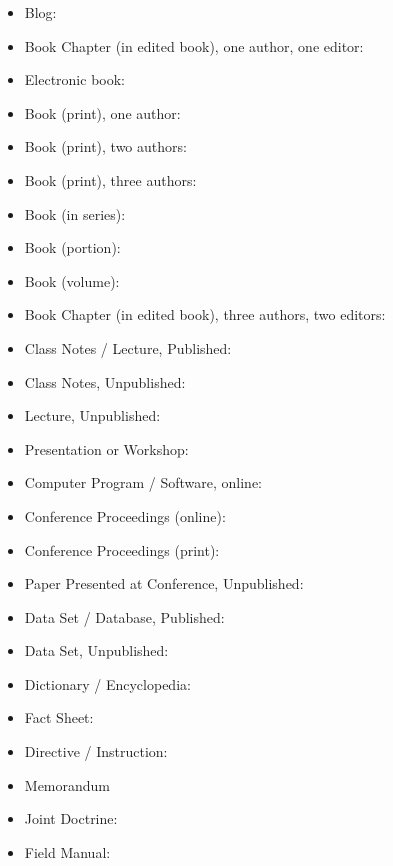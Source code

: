 \begin{itemize}
    \item Blog:  \citep{locke_2020}
    \item Book Chapter (in edited book), one author, one editor:  \citep{haynes_2009}
    \item Electronic book:  \citep{bonds_2014,krishnan_2008,Crabtree:Chaplin:2013}
    \item Book (print), one author:  \citep{pollan_2006}
    \item Book (print), two authors:  \citep{strindberg_warn_2011}
    \item Book (print), three authors:  \citep{Cordesman:2009}
    \item Book (in series):  \citep{abramowitz_64}
    \item Book (portion):  \citep{orend_2013}
    \item Book (volume):  \citep{myer_77}
    \item Book Chapter (in edited book), three authors, two editors:  \citep{Cordesman:2009}
    \item Class Notes / Lecture, Published:  \citep{Blanche:2017}
    \item Class Notes, Unpublished:  \citep{Houston:2016}
    \item Lecture, Unpublished:  \citep{Norton:2014}
    \item Presentation or Workshop:  \citep{Horse:2017}
    \item Computer Program / Software, online:  \citep{comprehensive_2005}
    \item Conference Proceedings (online):  \citep{morentz_2009}
    \item Conference Proceedings (print):  \citep{katz_2007}
    \item Paper Presented at Conference, Unpublished:  \citep{Teplin:EtAl:2005}
    \item Data Set / Database, Published:  \citep{Suro:2004,nsa_ipac_2012}
    \item Data Set, Unpublished:  \citep{Blanche:2006}
    \item Dictionary / Encyclopedia:  \citep{merriam_2017}
    \item Fact Sheet:  \citep{FLSA:2008}
    \item Directive / Instruction:  \citep{DOD.8570.01-M}
    \item Memorandum \citep{takai_2013}
    \item Joint Doctrine:  \citep{JP-3-01}
    \item Field Manual:  \citep{sniper_2011}

\end{itemize}
